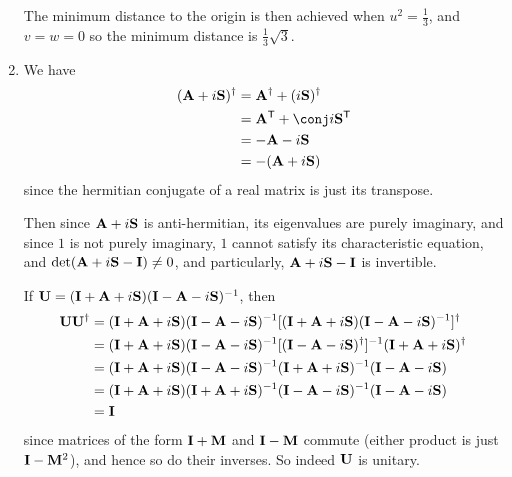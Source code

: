 \documentclass[fleqn,a4paper,11pt]{article}
\begin{document}
\begin{enumerate}[label=\textbf{\arabic*.}]
  The minimum distance to the origin is then achieved when \(u^2 = \frac 13\),
  and \(v = w = 0\) so the minimum distance is \(\frac 13 \sqrt 3\).
 \item
  We have
  \begin{align*}
   \herm{(\mat A + i\mat S)}
   &= \herm{\mat A} + \herm{(i \mat S)} \\
   &= \tran{\mat A} + \conj i \tran{\mat S} \\
   &= -\mat A - i \mat S \\
   &= -(\mat A + i \mat S)
  \end{align*}
  since the hermitian conjugate of a real matrix is just its transpose.

  Then since \(\mathbf{A} + i\mathbf{S}\) is anti-hermitian,
  its eigenvalues are purely imaginary, and since \(1\) is not purely imaginary,
  \(1\) cannot satisfy its characteristic equation, and
  \(\det(\mathbf{A} + i \mathbf{S} - \mathbf{I}) \ne 0\), and particularly,
  \(\mathbf{A} + i \mathbf{S} - \mathbf{I}\) is invertible.

  If \(\mathbf{U} = (\mathbf{I} + \mathbf{A} + i \mathbf{S})(\mathbf{I} - \mathbf{A} - i\mathbf{S})^{-1}\),
  then
  \begin{align*}
   \mathbf{U} \mathbf{U}^\dag
   &= (\mathbf{I} + \mathbf{A} + i \mathbf{S})
      (\mathbf{I} - \mathbf{A} - i\mathbf{S})^{-1}
      [(\mathbf{I} + \mathbf{A} + i \mathbf{S})
      (\mathbf{I} - \mathbf{A} - i\mathbf{S})^{-1}]^\dag \\
   &= (\mathbf{I} + \mathbf{A} + i \mathbf{S})
      (\mathbf{I} - \mathbf{A} - i\mathbf{S})^{-1}
      [(\mathbf{I} - \mathbf{A} - i\mathbf{S})^\dag]^{-1}
      (\mathbf{I} + \mathbf{A} + i \mathbf{S})^\dag \\
   &= (\mathbf{I} + \mathbf{A} + i \mathbf{S})
      (\mathbf{I} - \mathbf{A} - i\mathbf{S})^{-1}
      (\mathbf{I} + \mathbf{A} + i\mathbf{S})^{-1}
      (\mathbf{I} - \mathbf{A} - i \mathbf{S}) \\
   &= (\mathbf{I} + \mathbf{A} + i \mathbf{S})
      (\mathbf{I} + \mathbf{A} + i\mathbf{S})^{-1}
      (\mathbf{I} - \mathbf{A} - i\mathbf{S})^{-1}
      (\mathbf{I} - \mathbf{A} - i \mathbf{S}) \\
   &= \mathbf{I}
  \end{align*}
  since matrices of the form \(\mathbf{I} + \mathbf{M}\) and \(\mathbf{I} - \mathbf{M}\)
  commute (either product is just \(\mathbf{I} - \mathbf{M}^2\)), and hence so do their
  inverses. So indeed \(\mathbf{U}\) is unitary.


\end{enumerate}
\end{document}
